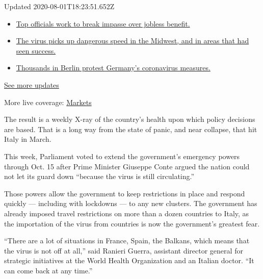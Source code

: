 Updated 2020-08-01T18:23:51.652Z

\begin{itemize}
\tightlist
\item
  \href{https://www.nytimes.com/2020/08/01/world/coronavirus-covid-19.html?action=click\&pgtype=Article\&state=default\&region=MAIN_CONTENT_1\&context=storylines_live_updates\#link-3ac56579}{Top
  officials work to break impasse over jobless benefit.}
\item
  \href{https://www.nytimes.com/2020/08/01/world/coronavirus-covid-19.html?action=click\&pgtype=Article\&state=default\&region=MAIN_CONTENT_1\&context=storylines_live_updates\#link-8796723}{The
  virus picks up dangerous speed in the Midwest, and in areas that had
  seen success.}
\item
  \href{https://www.nytimes.com/2020/08/01/world/coronavirus-covid-19.html?action=click\&pgtype=Article\&state=default\&region=MAIN_CONTENT_1\&context=storylines_live_updates\#link-25930521}{Thousands
  in Berlin protest Germany's coronavirus measures.}
\end{itemize}

\href{https://www.nytimes.com/2020/08/01/world/coronavirus-covid-19.html?action=click\&pgtype=Article\&state=default\&region=MAIN_CONTENT_1\&context=storylines_live_updates}{See
more updates}

More live coverage:
\href{https://www.nytimes.com/live/2020/07/31/business/stock-market-today-coronavirus?action=click\&pgtype=Article\&state=default\&region=MAIN_CONTENT_1\&context=storylines_live_updates}{Markets}

The result is a weekly X-ray of the country's health upon which policy
decisions are based. That is a long way from the state of panic, and
near collapse, that hit Italy in March.

This week, Parliament voted to extend the government's emergency powers
through Oct. 15 after Prime Minister Giuseppe Conte argued the nation
could not let its guard down ``because the virus is still circulating.''

Those powers allow the government to keep restrictions in place and
respond quickly --- including with lockdowns --- to any new clusters.
The government has already imposed travel restrictions on more than a
dozen countries to Italy, as the importation of the virus from countries
is now the government's greatest fear.

``There are a lot of situations in France, Spain, the Balkans, which
means that the virus is not off at all,'' said Ranieri Guerra, assistant
director general for strategic initiatives at the World Health
Organization and an Italian doctor. ``It can come back at any time.''

